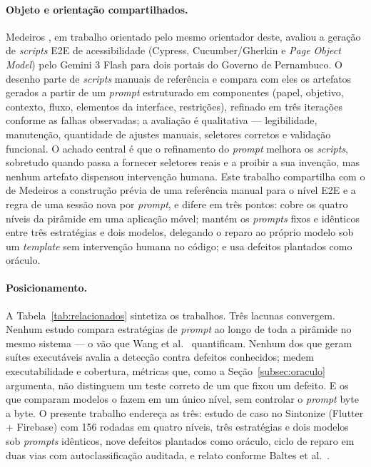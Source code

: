 \documentclass[12pt]{article}
\begin{document}
\paragraph{Objeto e orientação compartilhados.} Medeiros
\cite{medeiros2026acessibilidade}, em trabalho orientado pelo mesmo
orientador deste, avaliou a geração de \textit{scripts} E2E de acessibilidade
(Cypress, Cucumber/Gherkin e \textit{Page Object Model}) pelo Gemini 3 Flash
para dois portais do Governo de Pernambuco. O desenho parte de
\textit{scripts} manuais de referência e compara com eles os artefatos
gerados a partir de um \textit{prompt} estruturado em componentes (papel,
objetivo, contexto, fluxo, elementos da interface, restrições), refinado em
três iterações conforme as falhas observadas; a avaliação é qualitativa ---
legibilidade, manutenção, quantidade de ajustes manuais, seletores corretos
e validação funcional. O achado central é que o refinamento do \textit{prompt}
melhora os \textit{scripts}, sobretudo quando passa a fornecer seletores
reais e a proibir a sua invenção, mas nenhum artefato dispensou intervenção
humana. Este trabalho compartilha com o de Medeiros a construção prévia de
uma referência manual para o nível E2E e a regra de uma sessão nova por
\textit{prompt}, e difere em três pontos: cobre os quatro níveis da pirâmide
em uma aplicação móvel; mantém os \textit{prompts} fixos e idênticos entre
três estratégias e dois modelos, delegando o reparo ao próprio modelo sob um
\textit{template} sem intervenção humana no código; e usa defeitos plantados
como oráculo.

\paragraph{Posicionamento.} A Tabela~\ref{tab:relacionados} sintetiza os
trabalhos. Três lacunas convergem. Nenhum estudo compara estratégias de
\textit{prompt} ao longo de toda a pirâmide no mesmo sistema --- o vão que
Wang et al.~\cite{wang2024survey} quantificam. Nenhum dos que geram suítes
executáveis avalia a detecção contra defeitos conhecidos; medem
executabilidade e cobertura, métricas que, como a Seção~\ref{subsec:oraculo}
argumenta, não distinguem um teste correto de um que fixou um defeito. E os
que comparam modelos o fazem em um único nível, sem controlar o
\textit{prompt} byte a byte. O presente trabalho endereça as três: estudo de
caso no Sintonize (Flutter + Firebase) com 156 rodadas em quatro níveis, três
estratégias e dois modelos sob \textit{prompts} idênticos, nove defeitos
plantados como oráculo, ciclo de reparo em duas vias com autoclassificação
auditada, e relato conforme Baltes et al.~\cite{baltes2026guidelines}.
\end{document}
